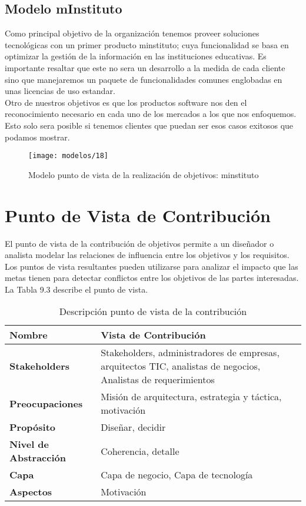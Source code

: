    \subsection{Modelo mInstituto}
   Como principal objetivo de la organización tenemos proveer soluciones tecnológicas con un primer producto minstituto; cuya funcionalidad se basa en optimizar la gestión de la información en las instituciones educativas. Es importante resaltar que este no sera un desarrollo a la medida de cada cliente sino que manejaremos un paquete de funcionalidades comunes englobadas en unas licencias de uso estandar. \\
   
   Otro de nuestros objetivos es que los productos software nos den el reconocimiento necesario en cada uno de los mercados a los que nos enfoquemos. Esto solo sera posible si tenemos clientes que puedan ser esos casos exitosos que podamos mostrar.

   \begin{figure}[H]
   	\centering
   	\texttt{[image: modelos/18]}
   	\captionsetup{width=.95\textwidth}
   	\caption{Modelo punto de vista de la realización de objetivos: minstituto}
   	\label{modelo18}
   \end{figure}
   
\section{Punto de Vista de Contribución}
El punto de vista de la contribución de objetivos permite a un diseñador o analista modelar las relaciones de influencia entre los objetivos y los requisitos. Los puntos de vista resultantes pueden utilizarse para analizar el impacto que las metas tienen para detectar conflictos entre los objetivos de las partes interesadas. La Tabla 9.3 describe el punto de vista.
   
   \begin{table}[H]
   	\centering
   	\begin{tabular}{p{3.7cm}p{8cm}}
   		\hline
   		\rowcolor[HTML]{0073a1}
   		{\color[HTML]{FFFFFF} \textbf{Nombre}} & {\color[HTML]{FFFFFF} \textbf{Vista de Contribución}} \\
   		\hline
   		\textbf{Stakeholders} & Stakeholders, administradores de empresas, arquitectos TIC, analistas de negocios, Analistas de requerimientos \\
   		\textbf{Preocupaciones} &  Misión de arquitectura, estrategia y táctica, motivación \\
   		\textbf{Propósito} & Diseñar, decidir \\
   		\textbf{Nivel de Abstracción} & Coherencia, detalle \\
   		\textbf{Capa} & Capa de negocio, Capa de tecnología \\
   		\textbf{Aspectos} & Motivación \\
   		\bottomrule
   	\end{tabular}
   	\captionsetup{width=.95\textwidth}
   	\caption{Descripción punto de vista de la contribución}
   	\label{tabla22}
   \end{table}
   
